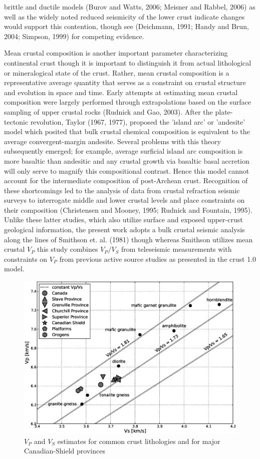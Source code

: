 \documentclass[review]{elsarticle}
\begin{document}
brittle and ductile models (Burov and Watts, 2006; Meisner and Rabbel, 2006) as well as the widely noted reduced seismicity of the lower crust indicate changes would support this contention, though see (Deichmann, 1991; Handy and Brun, 2004; Simpson, 1999) for competing evidence.

Mean crustal composition is another important parameter characterizing continental crust though it is important to distinguish it from actual lithological or mineralogical state of the crust. Rather, mean crustal composition is a representative average quantity that serves as a constraint on crustal structure and evolution in space and time. Early attempts at estimating mean crustal composition were largely performed through extrapolations based on the surface sampling of upper crustal rocks (Rudnick and Gao, 2003). After the plate-tectonic revolution, Taylor (1967, 1977), proposed the 'island arc' or 'andesite' model which posited that bulk crustal chemical composition is equivalent to the average convergent-margin andesite. Several problems with this theory subsequently emerged; for example, average surficial island arc composition is more basaltic than andesitic and any crustal growth via basaltic basal accretion will only serve to magnify this compositional contrast. Hence this model cannot account for the intermediate composition of post-Archean crust. Recognition of these shortcomings led to the analysis of data from crustal refraction seismic surveys to interrogate middle and lower crustal levels and place constraints on their composition (Christensen and Mooney, 1995; Rudnick and Fountain, 1995). Unlike these latter studies, which also utilize surface and exposed upper-crust geological information, the present work adopts a bulk crustal seismic analysis along the lines of Smithson et. al. (1981) though whereas Smithson utilizes mean crustal $V_P$ this study combines $V_P/V_S$ from teleseismic measurements with constraints on $V_P$ from previous active source studies as presented in the crust 1.0 model.

\begin{figure}
  \centering
  \includegraphics[width=\textwidth]{lithology.eps}
  \caption{$V_P$ and $V_S$ estimates for common crust lithologies and for major Canadian-Shield provinces}
  \label{fig:lith}
\end{figure}
\end{document}
